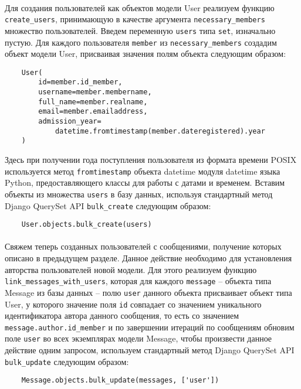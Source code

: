 \documentclass[12pt, a4paper, oneside]{article}
\begin{document}
\paragraph{}
Для создания пользователей как объектов модели User реализуем функцию \texttt{create\_users}, принимающую в качестве аргумента \texttt{necessary\_members} множество пользователей. Введем переменную \texttt{users} типа \texttt{set}, изначально пустую. Для каждого пользователя \texttt{member} из \texttt{necessary\_members} создадим объект модели User, присваивая значения полям объекта следующим образом:
\begin{verbatim}
    User(
        id=member.id_member,
        username=member.membername,
        full_name=member.realname,
        email=member.emailaddress,
        admission_year=
            datetime.fromtimestamp(member.dateregistered).year
    )
\end{verbatim}
Здесь при получении года поступления пользователя из формата времени POSIX используется метод \texttt{fromtimestamp} объекта datetime модуля datetime \cite{python-datetime} языка Python, предоставляющего классы для работы с датами и временем. Вставим объекты из множества \texttt{users} в базу данных, используя стандартный метод Django QuerySet API \texttt{bulk\_create} следующим образом:
\begin{verbatim}
    User.objects.bulk_create(users)
\end{verbatim}
\paragraph{}
Свяжем теперь созданных пользователей с сообщениями, получение которых описано в предыдущем разделе. Данное действие необходимо для установления авторства пользователей новой модели. Для этого реализуем функцию \texttt{link\_messages\_with\_users}, которая для каждого \texttt{message} – объекта типа Message из базы данных – полю \texttt{user} данного объекта присваивает объект типа User, у которого значение поля \texttt{id} совпадает со значением уникального идентификатора автора данного сообщения, то есть со значением \texttt{message.author.id\_member} и по завершении итераций по сообщениям обновим поле \texttt{user} во всех экземплярах модели Message, чтобы произвести данное действие одним запросом, используем стандартный метод Django QuerySet API \texttt{bulk\_update} следующим образом:
\begin{verbatim}
    Message.objects.bulk_update(messages, ['user'])
\end{verbatim}
\vspace{1cm}
\end{document}
